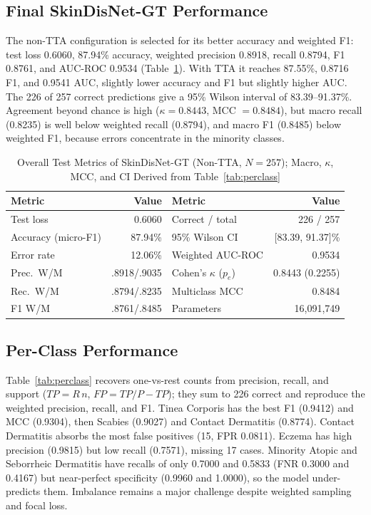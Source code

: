 \documentclass[conference]{IEEEtran}
\begin{document}
\subsection{Final SkinDisNet-GT Performance}
The non-TTA configuration is selected for its better accuracy and weighted F1: test loss 0.6060, 87.94\% accuracy, weighted precision 0.8918, recall 0.8794, F1 0.8761, and AUC-ROC 0.9534 (Table~\ref{tab:final}). With TTA it reaches 87.55\%, 0.8716 F1, and 0.9541 AUC, slightly lower accuracy and F1 but slightly higher AUC. The 226 of 257 correct predictions give a 95\% Wilson interval of 83.39--91.37\%. Agreement beyond chance is high ($\kappa=0.8443$, MCC $=0.8484$), but macro recall (0.8235) is well below weighted recall (0.8794), and macro F1 (0.8485) below weighted F1, because errors concentrate in the minority classes.

\begin{table}[!t]
\caption{Overall Test Metrics of SkinDisNet-GT (Non-TTA, $N=257$); Macro, $\kappa$, MCC, and CI Derived from Table~\ref{tab:perclass}}
\label{tab:final}
\centering
\footnotesize
\setlength{\tabcolsep}{3pt}
\begin{tabular}{@{}lr|lr@{}}
\toprule
\textbf{Metric} & \textbf{Value} & \textbf{Metric} & \textbf{Value} \\
\midrule
Test loss & 0.6060 & Correct / total & 226 / 257 \\
Accuracy (micro-F1) & 87.94\% & 95\% Wilson CI & [83.39, 91.37]\% \\
Error rate & 12.06\% & Weighted AUC-ROC & 0.9534 \\
Prec.\ W/M & .8918/.9035 & Cohen's $\kappa$ ($p_e$) & 0.8443 (0.2255) \\
Rec.\ W/M & .8794/.8235 & Multiclass MCC & 0.8484 \\
F1 W/M & .8761/.8485 & Parameters & 16,091,749 \\
\bottomrule
\end{tabular}
\end{table}

\subsection{Per-Class Performance}
Table~\ref{tab:perclass} recovers one-vs-rest counts from precision, recall, and support ($TP=R\,n$, $FP=TP/P-TP$); they sum to 226 correct and reproduce the weighted precision, recall, and F1. Tinea Corporis has the best F1 (0.9412) and MCC (0.9304), then Scabies (0.9027) and Contact Dermatitis (0.8774). Contact Dermatitis absorbs the most false positives (15, FPR 0.0811). Eczema has high precision (0.9815) but low recall (0.7571), missing 17 cases. Minority Atopic and Seborrheic Dermatitis have recalls of only 0.7000 and 0.5833 (FNR 0.3000 and 0.4167) but near-perfect specificity (0.9960 and 1.0000), so the model under-predicts them. Imbalance remains a major challenge despite weighted sampling and focal loss.
\end{document}
